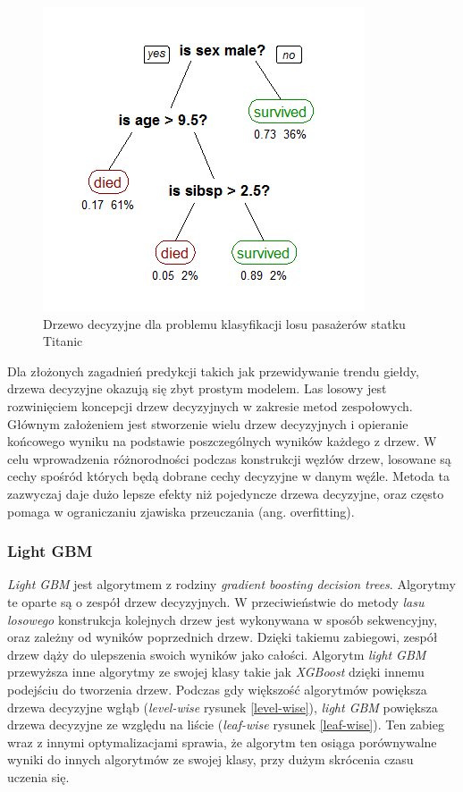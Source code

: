 \documentclass[a4paper, twoside, 11pt, openright]{article}
\begin{document}
\begin{figure}[H]
\centering \includegraphics[scale=0.6]{img/decision_tree.png}
\caption{Drzewo decyzyjne dla problemu klasyfikacji losu pasażerów statku Titanic \cite{wikidecisiontree}}
\label{wiki_dec_tree}
\end{figure}

Dla złożonych zagadnień predykcji takich jak przewidywanie trendu giełdy, drzewa decyzyjne okazują się zbyt prostym modelem. Las losowy jest rozwinięciem koncepcji drzew decyzyjnych w zakresie metod zespołowych. Głównym założeniem jest stworzenie wielu drzew decyzyjnych i opieranie końcowego wyniku na podstawie poszczególnych wyników każdego z drzew. W celu wprowadzenia różnorodności podczas konstrukcji węzłów drzew, losowane są cechy spośród których będą dobrane cechy decyzyjne w danym węźle. Metoda ta zazwyczaj daje dużo lepsze efekty niż pojedyncze drzewa decyzyjne, oraz często pomaga w ograniczaniu zjawiska przeuczania (ang. overfitting).  

\subsubsection{Light GBM \cite{lgbm}}

\textit{Light GBM} jest algorytmem z rodziny \textit{gradient boosting decision trees}. Algorytmy te oparte są o zespół drzew decyzyjnych. W przeciwieństwie do metody \textit{lasu losowego} konstrukcja kolejnych drzew jest wykonywana w sposób sekwencyjny, oraz zależny od wyników poprzednich drzew. Dzięki takiemu zabiegowi, zespół drzew dąży do ulepszenia swoich wyników jako całości. Algorytm \textit{light GBM} przewyższa inne algorytmy ze swojej klasy takie jak \textit{XGBoost} dzięki innemu podejściu do tworzenia drzew. Podczas gdy większość algorytmów powiększa drzewa decyzyjne wgłąb (\textit{level-wise}  rysunek \ref{level-wise}), \textit{light GBM} powiększa drzewa decyzyjne ze względu na liście (\textit{leaf-wise} rysunek \ref{leaf-wise}). Ten zabieg wraz z innymi optymalizacjami sprawia, że algorytm ten osiąga porównywalne wyniki do innych algorytmów ze swojej klasy, przy dużym skrócenia czasu uczenia się. 
\end{document}
